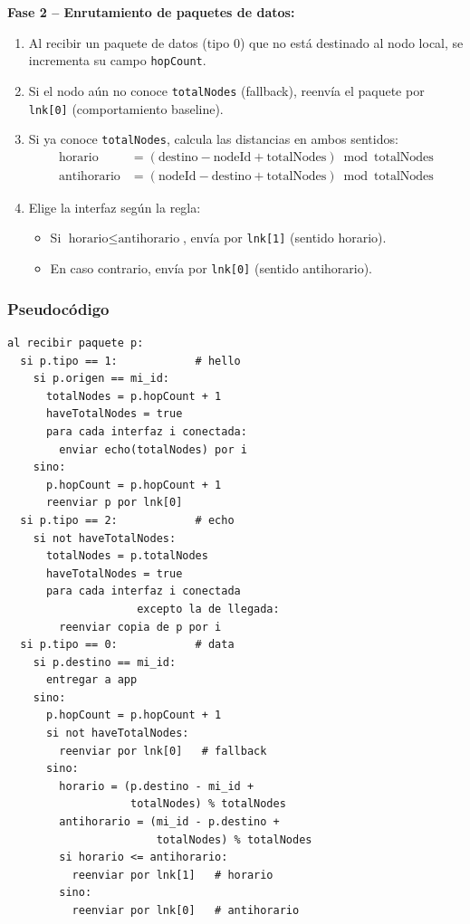\documentclass[10pt,letterpaper,twocolumn]{article}
\begin{document}
\textbf{Fase 2 – Enrutamiento de paquetes de datos:}
\begin{enumerate}
    \item Al recibir un paquete de datos (tipo 0) que no está destinado al nodo local,
        se incrementa su campo \texttt{hopCount}.
    \item Si el nodo aún no conoce \texttt{totalNodes} (fallback), reenvía el paquete
        por \texttt{lnk[0]} (comportamiento baseline).
    \item Si ya conoce \texttt{totalNodes}, calcula las distancias en ambos sentidos:
        \[
        \begin{aligned}
        \mathrm{horario}
            &= (\mathrm{destino} - \mathrm{nodeId} + \mathrm{totalNodes})
            \bmod \mathrm{totalNodes} \\
        \mathrm{antihorario}
            &= (\mathrm{nodeId} - \mathrm{destino} + \mathrm{totalNodes})
            \bmod \mathrm{totalNodes}
        \end{aligned}
        \]
    \item Elige la interfaz según la regla:
        \begin{itemize}
            \item Si \(\text{horario} \le \text{antihorario}\), envía por \texttt{lnk[1]} (sentido horario).
            \item En caso contrario, envía por \texttt{lnk[0]} (sentido antihorario).
        \end{itemize}
\end{enumerate}

\subsubsection*{Pseudocódigo}

\begin{small}
\begin{verbatim}
al recibir paquete p:
  si p.tipo == 1:            # hello
    si p.origen == mi_id:
      totalNodes = p.hopCount + 1
      haveTotalNodes = true
      para cada interfaz i conectada:
        enviar echo(totalNodes) por i
    sino:
      p.hopCount = p.hopCount + 1
      reenviar p por lnk[0]
  si p.tipo == 2:            # echo
    si not haveTotalNodes:
      totalNodes = p.totalNodes
      haveTotalNodes = true
      para cada interfaz i conectada 
                    excepto la de llegada:
        reenviar copia de p por i
  si p.tipo == 0:            # data
    si p.destino == mi_id:
      entregar a app
    sino:
      p.hopCount = p.hopCount + 1
      si not haveTotalNodes:
        reenviar por lnk[0]   # fallback
      sino:
        horario = (p.destino - mi_id + 
                   totalNodes) % totalNodes
        antihorario = (mi_id - p.destino + 
                       totalNodes) % totalNodes
        si horario <= antihorario:
          reenviar por lnk[1]   # horario
        sino:
          reenviar por lnk[0]   # antihorario
\end{verbatim}
\end{small}
\end{document}
